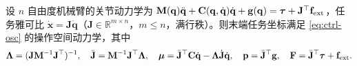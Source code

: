 \begin{theorem}
\label{thm:os-opspace}
设 $n$ 自由度机械臂的关节动力学为 $\mathbf M(\mathbf q)\ddot{\mathbf q}+\mathbf C(\mathbf q,\dot{\mathbf q})\dot{\mathbf q}+\mathbf g(\mathbf q)=\boldsymbol\tau+\mathbf J^\top\mathbf f_{\rm ext}$，任务雅可比 $\dot{\mathbf x}=\mathbf J\dot{\mathbf q}$（$\mathbf J\in\mathbb R^{m\times n}$，$m\le n$，满行秩）。则末端任务坐标满足 \cref{eq:ctrl-osc} 的操作空间动力学，其中
\begin{equation}
  \boldsymbol\Lambda=(\mathbf J\mathbf M^{-1}\mathbf J^\top)^{-1},\quad
  \bar{\mathbf J}=\mathbf M^{-1}\mathbf J^\top\boldsymbol\Lambda,\quad
  \boldsymbol\mu=\bar{\mathbf J}^\top\mathbf C\dot{\mathbf q}-\boldsymbol\Lambda\dot{\mathbf J}\dot{\mathbf q},\quad
  \mathbf p=\bar{\mathbf J}^\top\mathbf g,\quad
  \mathbf F=\bar{\mathbf J}^\top\boldsymbol\tau+\mathbf f_{\rm ext}.
  \label{eq:os-opspace-terms}
\end{equation}
\end{theorem}

